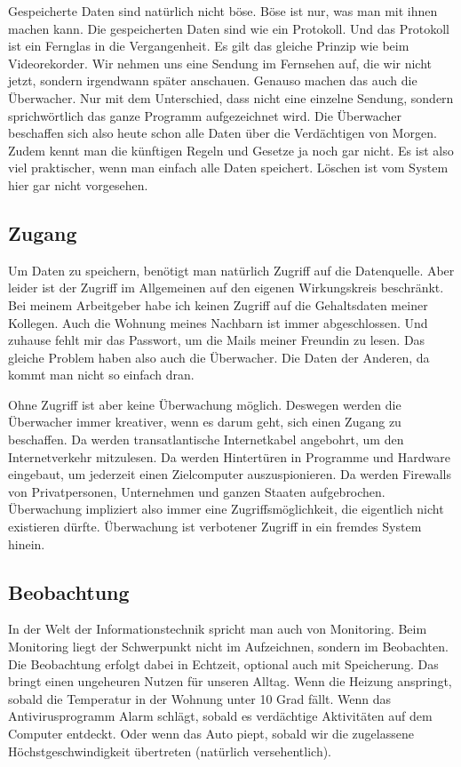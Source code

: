 	Gespeicherte Daten sind natürlich nicht böse. Böse ist nur, was man mit ihnen machen kann. Die gespeicherten Daten sind wie ein Protokoll. Und das Protokoll ist ein Fernglas in die Vergangenheit. Es gilt das gleiche Prinzip wie beim Videorekorder. Wir nehmen uns eine Sendung im Fernsehen auf, die wir nicht jetzt, sondern irgendwann später anschauen. Genauso machen das auch die Überwacher. Nur mit dem Unterschied, dass nicht eine einzelne Sendung, sondern sprichwörtlich das ganze Programm aufgezeichnet wird. Die Überwacher beschaffen sich also heute schon alle Daten über die Verdächtigen von Morgen. Zudem kennt man die künftigen Regeln und Gesetze ja noch gar nicht. Es ist also viel praktischer, wenn man einfach alle Daten speichert. Löschen ist vom System hier gar nicht vorgesehen.
	
	\subsection{Zugang}
	Um Daten zu speichern, benötigt man natürlich Zugriff auf die Datenquelle. Aber leider ist der Zugriff im Allgemeinen auf den eigenen Wirkungskreis beschränkt. Bei meinem Arbeitgeber habe ich keinen Zugriff auf die Gehaltsdaten meiner Kollegen. Auch die Wohnung meines Nachbarn ist immer abgeschlossen. Und zuhause fehlt mir das Passwort, um die Mails meiner Freundin zu lesen. Das gleiche Problem haben also auch die Überwacher. Die Daten der Anderen, da kommt man nicht so einfach dran.
	
	Ohne Zugriff ist aber keine Überwachung möglich. Deswegen werden die Überwacher immer kreativer, wenn es darum geht, sich einen Zugang zu beschaffen. Da werden transatlantische Internetkabel angebohrt, um den Internetverkehr mitzulesen. Da werden Hintertüren in Programme und Hardware eingebaut, um jederzeit einen Zielcomputer auszuspionieren. Da werden Firewalls von Privatpersonen, Unternehmen und ganzen Staaten aufgebrochen. Überwachung impliziert also immer eine Zugriffsmöglichkeit, die eigentlich nicht existieren dürfte. Überwachung ist verbotener Zugriff in ein fremdes System hinein.
	
	\subsection{Beobachtung}
	In der Welt der Informationstechnik spricht man auch von Monitoring. Beim Monitoring liegt der Schwerpunkt nicht im Aufzeichnen, sondern im Beobachten. Die Beobachtung erfolgt dabei in Echtzeit, optional auch mit Speicherung. Das bringt einen ungeheuren Nutzen für unseren Alltag. Wenn die Heizung anspringt, sobald die Temperatur in der Wohnung unter 10 Grad fällt. Wenn das Antivirusprogramm Alarm schlägt, sobald es verdächtige Aktivitäten auf dem Computer entdeckt. Oder wenn das Auto piept, sobald wir die zugelassene Höchstgeschwindigkeit übertreten (natürlich versehentlich).
	
